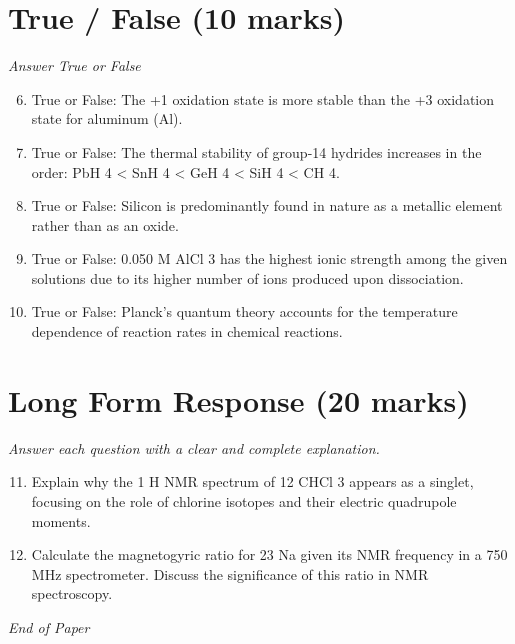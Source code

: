 \documentclass[12pt]{article}
\begin{document}
\section*{True / False (10 marks)}
\textit{Answer True or False}
\begin{enumerate}[label=\arabic*.]
\setcounter{enumi}{5}
\item True or False: The +1 oxidation state is more stable than the +3 oxidation state for aluminum (Al).
\item True or False: The thermal stability of group-14 hydrides increases in the order: PbH 4 \textless{} SnH 4 \textless{} GeH 4 \textless{} SiH 4 \textless{} CH 4.
\item True or False: Silicon is predominantly found in nature as a metallic element rather than as an oxide.
\item True or False: 0.050 M AlCl 3 has the highest ionic strength among the given solutions due to its higher number of ions produced upon dissociation.
\item True or False: Planck's quantum theory accounts for the temperature dependence of reaction rates in chemical reactions.
\end{enumerate}

\section*{Long Form Response (20 marks)}
\textit{Answer each question with a clear and complete explanation.}
\begin{enumerate}[label=\arabic*.]
\setcounter{enumi}{10}
\item Explain why the 1 H NMR spectrum of 12 CHCl 3 appears as a singlet, focusing on the role of chlorine isotopes and their electric quadrupole moments.
\item Calculate the magnetogyric ratio for 23 Na given its NMR frequency in a 750 MHz spectrometer. Discuss the significance of this ratio in NMR spectroscopy.
\end{enumerate}

\vfill
\noindent\textit{End of Paper}
\end{document}
